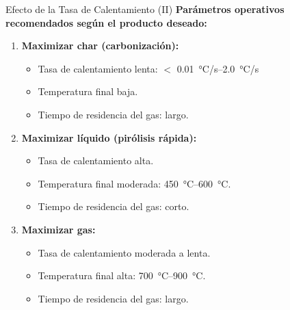 \documentclass[../../main.tex]{subfiles}
\begin{document}
\begin{frame}{Efecto de la Tasa de Calentamiento (II)}
\small
\textbf{Parámetros operativos recomendados según el producto deseado:}
\vspace{0.3cm}
\begin{enumerate}
  \item[\textbf{a.}] \textbf{Maximizar char (carbonización):}
  \begin{itemize}
    \item Tasa de calentamiento lenta: $<$ \SI{0.01}{\degreeCelsius/s}–\SI{2.0}{\degreeCelsius/s}
    \item Temperatura final baja.
    \item Tiempo de residencia del gas: largo.
  \end{itemize}

  \item[\textbf{b.}] \textbf{Maximizar líquido (pirólisis rápida):}
  \begin{itemize}
    \item Tasa de calentamiento alta.
    \item Temperatura final moderada: \SI{450}{\degreeCelsius}–\SI{600}{\degreeCelsius}.
    \item Tiempo de residencia del gas: corto.
  \end{itemize}

  \item[\textbf{c.}] \textbf{Maximizar gas:}
  \begin{itemize}
    \item Tasa de calentamiento moderada a lenta.
    \item Temperatura final alta: \SI{700}{\degreeCelsius}–\SI{900}{\degreeCelsius}.
    \item Tiempo de residencia del gas: largo.
  \end{itemize}
\end{enumerate}
\end{frame}
\end{document}
